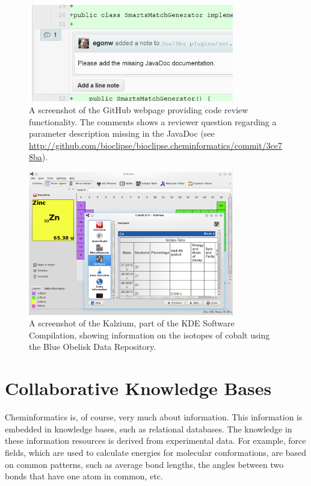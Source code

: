 \documentclass[11pt]{book}
\begin{document}
\begin{figure}[bt]
\begin{center}
\includegraphics[width=0.8\textwidth]{graphics/codeReview8.png}
\end{center}
\caption{A screenshot of the GitHub webpage providing code
review functionality. The comments shows a reviewer question
regarding a parameter description missing in the JavaDoc
(see \url{http://github.com/bioclipse/bioclipse.cheminformatics/commit/3ce78ba}).}
\label{fig:githubCodereview}
\end{figure}

\begin{figure}[bt]
\begin{center}
\includegraphics[width=0.8\textwidth]{graphics/kalzium.png}
\end{center}
\caption{A screenshot of the Kalzium, part of the KDE Software
Compilation, showing information on the
isotopes of cobalt using the Blue Obelisk Data Repository.}
\label{fig:kalzium}
\end{figure}

\section{Collaborative Knowledge Bases}

Cheminformatics is, of course, very much about information. This
information is embedded in knowledge bases, such as relational databases.
The knowledge in these information resources is derived from experimental
data. For example, force fields, which are used to calculate energies
for molecular conformations, are based on common patterns, such as
average bond lengths, the angles between two bonds that have one
atom in common, etc.
\end{document}

